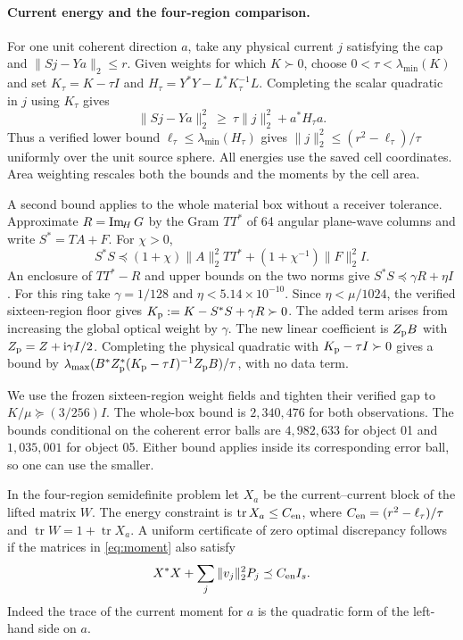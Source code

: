 \documentclass[anonymous,12pt]{iopjournal}
\theoremstyle{remark}\newtheorem{remark}[theorem]{Remark}
\newcommand{\tr}{\operatorname{tr}}\newcommand{\diag}{\operatorname{diag}}
\numberwithin{equation}{section}
\begin{document}
\paragraph{Current energy and the four-region comparison.}
For one unit coherent direction $a$, take any physical current $j$ satisfying the cap and $\|Sj-Ya\|_2\le r$. Given weights for which $K\succ0$, choose $0<\tau<\lambda_{\min}(K)$ and set $K_\tau=K-\tau I$ and $H_\tau=Y^*Y-L^*K_\tau^{-1}L$. Completing the scalar quadratic in $j$ using $K_\tau$ gives
\begin{equation}
 \|Sj-Ya\|_2^2\ \ge\ \tau\|j\|_2^2+a^*H_\tau a .
 \label{eq:energybound}
\end{equation}
Thus a verified lower bound $\ell_\tau\le\lambda_{\min}(H_\tau)$ gives $\|j\|_2^2\le(r^2-\ell_\tau)/\tau$ uniformly over the unit source sphere. All energies use the saved cell coordinates. Area weighting rescales both the bounds and the moments by the cell area.

A second bound applies to the whole material box without a receiver tolerance. Approximate $R=\operatorname{Im}_{\!H} G$ by the Gram $TT^*$ of 64 angular plane-wave columns and write $S^*=TA+F$. For $\chi>0$,
\[
 S^*S\preceq (1+\chi)\|A\|_2^2 TT^*+(1+\chi^{-1})\|F\|_2^2 I.
\]
An enclosure of $TT^*-R$ and upper bounds on the two norms give $S^*S\preceq\gamma R+\eta I$. For this ring take $\gamma=1/128$ and $\eta<5.14\times10^{-10}$. Since $\eta<\mu/1024$, the verified sixteen-region floor gives $K_{\rm p}:=K-S^*S+\gamma R\succ0$. The added term arises from increasing the global optical weight by $\gamma$. The new linear coefficient is $Z_{\rm p}B$ with $Z_{\rm p}=Z+\mathrm i\gamma I/2$. Completing the physical quadratic with $K_{\rm p}-\tau I\succ0$ gives a bound by $\lambda_{\max}(B^*Z_{\rm p}^*(K_{\rm p}-\tau I)^{-1}Z_{\rm p}B)/\tau$, with no data term.

We use the frozen sixteen-region weight fields and tighten their verified gap to $K/\mu\succeq(3/256)I$. The whole-box bound is $2{,}340{,}476$ for both observations. The bounds conditional on the coherent error balls are $4{,}982{,}633$ for object 01 and $1{,}035{,}001$ for object 05. Either bound applies inside its corresponding error ball, so one can use the smaller.

In the four-region semidefinite problem let $X_a$ be the current--current block of the lifted matrix $W$. The energy constraint is $\tr X_a\le C_{\rm en}$, where $C_{\rm en}=(r^2-\ell_\tau)/\tau$ and $\tr W=1+\tr X_a$. A uniform certificate of zero optimal discrepancy follows if the matrices in \eqref{eq:moment} also satisfy
\begin{equation}
 X^*X+\sum_j\|v_j\|_2^2P_j\preceq C_{\rm en} I_s .
 \label{eq:momentenergy}
\end{equation}
Indeed the trace of the current moment for $a$ is the quadratic form of the left-hand side on $a$.
\end{document}
